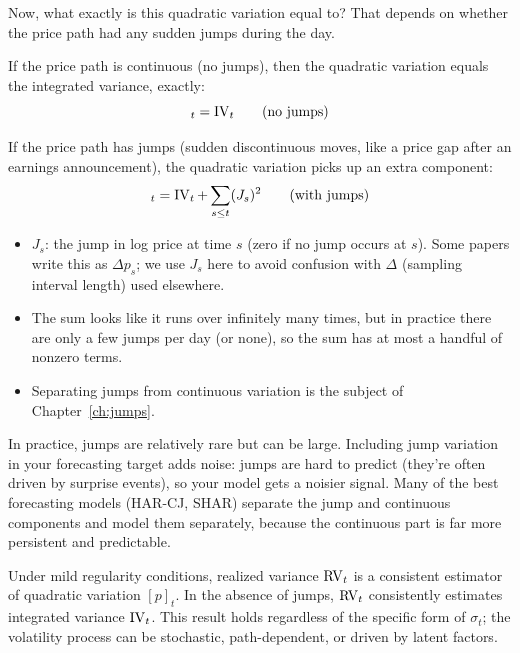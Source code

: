 Now, what exactly is this quadratic variation equal to?
That depends on whether the price path had any sudden jumps during the day.

If the price path is continuous (no jumps), then the quadratic variation equals the integrated variance, exactly:
\begin{equation}
  [p]_t = \IVol_t \qquad (\text{no jumps})
  \label{eq:qv-equals-iv}
\end{equation}

If the price path has jumps (sudden discontinuous moves, like a price gap after an earnings announcement), the quadratic variation picks up an extra component:
\begin{equation}
  [p]_t = \IVol_t + \sum_{s \leq t} (J_s)^2 \qquad (\text{with jumps})
  \label{eq:qv-with-jumps}
\end{equation}
\begin{itemize}[nosep]
  \item $J_s$: the jump in log price at time $s$ (zero if no jump occurs at $s$). Some papers write this as $\Delta p_s$; we use $J_s$ here to avoid confusion with $\Delta$ (sampling interval length) used elsewhere.
  \item The sum looks like it runs over infinitely many times, but in practice there are only a few jumps per day (or none), so the sum has at most a handful of nonzero terms.
  \item Separating jumps from continuous variation is the subject of Chapter~\ref{ch:jumps}.
\end{itemize}

\begin{projectconnection}
In practice, jumps are relatively rare but can be large.
Including jump variation in your forecasting target adds noise: jumps are hard to predict (they're often driven by surprise events), so your model gets a noisier signal.
Many of the best forecasting models (HAR-CJ, SHAR) separate the jump and continuous components and model them separately, because the continuous part is far more persistent and predictable.
\end{projectconnection}

\begin{keyresult}
Under mild regularity conditions, realized variance $\operatorname{RV}_t$ is a consistent estimator of quadratic variation $[p]_t$.
In the absence of jumps, $\operatorname{RV}_t$ consistently estimates integrated variance $\operatorname{IV}_t$.
This result holds regardless of the specific form of $\sigma_t$; the volatility process can be stochastic, path-dependent, or driven by latent factors.
\end{keyresult}

